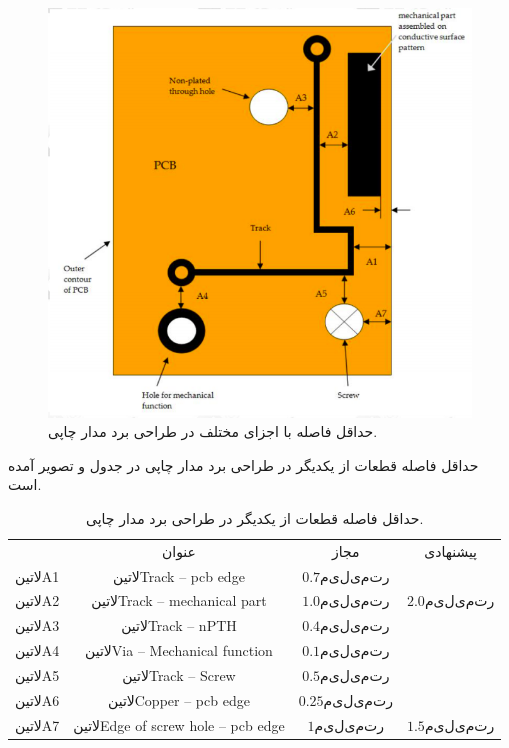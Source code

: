 \begin{figure}[!h]
	\centering
	\includegraphics[width=0.7\linewidth]{Assets/pcbdistance.png}
	\caption{حداقل فاصله با اجزای مختلف در طراحی برد مدار چاپی.}
	\label{fig:pcbdistance}
\end{figure}

حداقل فاصله قطعات از یکدیگر در طراحی برد مدار چاپی در جدول  و تصویر  آمده است.

\begin{table}[!h]
	\centering
	\caption{حداقل فاصله قطعات از یکدیگر در طراحی برد مدار چاپی.}
	\label{table:pcbdistance}
	\begin{tabular}{cccc}
		& عنوان & مجاز & پیشنهادی   \\
		‌لاتین{A1}	&  ‌لاتین{Track – pcb edge}     &  $0.7 میلی‌متر$     &            \\
		‌لاتین{A2}	&    ‌لاتین{Track – mechanical part}   & $1.0 میلی‌متر $     &            $2.0 میلی‌متر$\\
		‌لاتین{A3}	&  ‌لاتین{Track – nPTH}     &   $0.4 میلی‌متر $   &            \\
		‌لاتین{A4}	&  ‌لاتین{Via – Mechanical function}     &   $0.1 میلی‌متر $   &            \\
		‌لاتین{A5}	&  ‌لاتین{Track – Screw }     &   $0.5 میلی‌متر $   &            \\
		‌لاتین{A6}	&  ‌لاتین{Copper – pcb edge}     &   $0.25 میلی‌متر $   &            \\
		‌لاتین{A7}	&  ‌لاتین{Edge of screw hole – pcb edge}     &   $1 میلی‌متر $   &            $1.5 میلی‌متر$\\
	\end{tabular}
\end{table}

